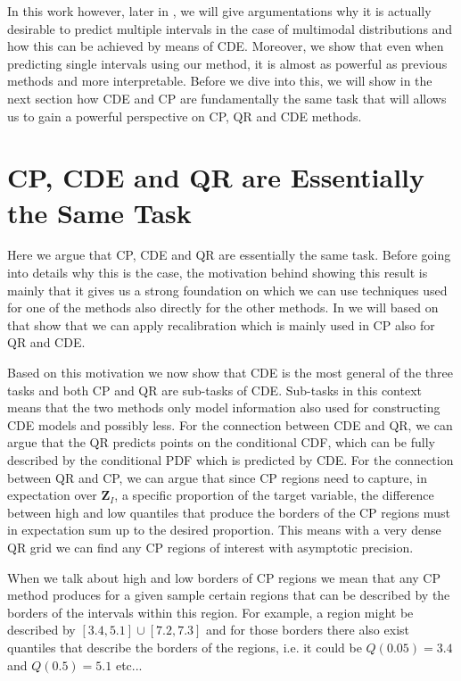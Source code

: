In this work however, later in , we will give argumentations why it is actually desirable to predict multiple intervals in the case of multimodal distributions and how this can be achieved by means of CDE. Moreover, we show that even when predicting single intervals using our method, it is almost as powerful as previous methods and more interpretable. Before we dive into this, we will show in the next section how CDE and CP are fundamentally the same task that will allows us to gain a powerful perspective on CP, QR and CDE methods.

\section{CP, CDE and QR are Essentially the Same Task}\label{sec:cp_sub_cde}

Here we argue that CP, CDE and QR are essentially the same task. Before going into details why this is the case, the motivation behind showing this result is mainly that it gives us a strong foundation on which we can use techniques used for one of the methods also directly for the other methods. In  we will based on that show that we can apply recalibration which is mainly used in CP also for QR and CDE.

Based on this motivation we now show that CDE is the most general of the three tasks and both CP and QR are sub-tasks of CDE. Sub-tasks in this context means that the two methods only model information also used for constructing CDE models and possibly less. For the connection between CDE and QR, we can argue that the QR predicts points on the conditional CDF, which can be fully described by the conditional PDF which is predicted by CDE. For the connection between QR and CP, we can argue that since CP regions need to capture, in expectation over $\mathbf{Z}_I$, a specific proportion of the target variable, the difference between high and low quantiles that produce the borders of the CP regions must in expectation sum up to the desired proportion. This means with a very dense QR grid we can find any CP regions of interest with asymptotic precision.

When we talk about high and low borders of CP regions we mean that any CP method produces for a given sample certain regions that can be described by the borders of the intervals within this region. For example, a region might be described by $[3.4, 5.1] \cup [7.2, 7.3]$ and for those borders there also exist quantiles that describe the borders of the regions, i.e. it could be $Q(0.05) = 3.4$ and $Q(0.5) = 5.1$ etc... %

